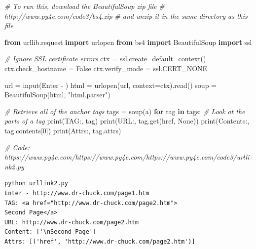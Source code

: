 \documentclass[10pt,]{book}
\newenvironment{Shaded}{}{}
\newcommand{\BuiltInTok}[1]{\textcolor[rgb]{0.00,0.50,0.00}{#1}}
\newcommand{\CommentTok}[1]{\textcolor[rgb]{0.38,0.63,0.69}{\textit{#1}}}
\newcommand{\ControlFlowTok}[1]{\textcolor[rgb]{0.00,0.44,0.13}{\textbf{#1}}}
\newcommand{\DecValTok}[1]{\textcolor[rgb]{0.25,0.63,0.44}{#1}}
\newcommand{\ImportTok}[1]{\textcolor[rgb]{0.00,0.50,0.00}{\textbf{#1}}}
\newcommand{\KeywordTok}[1]{\textcolor[rgb]{0.00,0.44,0.13}{\textbf{#1}}}
\newcommand{\NormalTok}[1]{#1}
\newcommand{\OperatorTok}[1]{\textcolor[rgb]{0.40,0.40,0.40}{#1}}
\newcommand{\StringTok}[1]{\textcolor[rgb]{0.25,0.44,0.63}{#1}}
\newcommand{\VariableTok}[1]{\textcolor[rgb]{0.10,0.09,0.49}{#1}}
\begin{document}
\begin{Shaded}
\begin{Highlighting}[]
\CommentTok{\# To run this, download the BeautifulSoup zip file}
\CommentTok{\# http://www.py4e.com/code3/bs4.zip}
\CommentTok{\# and unzip it in the same directory as this file}

\ImportTok{from}\NormalTok{ urllib.request }\ImportTok{import}\NormalTok{ urlopen}
\ImportTok{from}\NormalTok{ bs4 }\ImportTok{import}\NormalTok{ BeautifulSoup}
\ImportTok{import}\NormalTok{ ssl}

\CommentTok{\# Ignore SSL certificate errors}
\NormalTok{ctx }\OperatorTok{=}\NormalTok{ ssl.create\_default\_context()}
\NormalTok{ctx.check\_hostname }\OperatorTok{=} \VariableTok{False}
\NormalTok{ctx.verify\_mode }\OperatorTok{=}\NormalTok{ ssl.CERT\_NONE}

\NormalTok{url }\OperatorTok{=} \BuiltInTok{input}\NormalTok{(}\StringTok{\textquotesingle{}Enter {-} \textquotesingle{}}\NormalTok{)}
\NormalTok{html }\OperatorTok{=}\NormalTok{ urlopen(url, context}\OperatorTok{=}\NormalTok{ctx).read()}
\NormalTok{soup }\OperatorTok{=}\NormalTok{ BeautifulSoup(html, }\StringTok{"html.parser"}\NormalTok{)}

\CommentTok{\# Retrieve all of the anchor tags}
\NormalTok{tags }\OperatorTok{=}\NormalTok{ soup(}\StringTok{\textquotesingle{}a\textquotesingle{}}\NormalTok{)}
\ControlFlowTok{for}\NormalTok{ tag }\KeywordTok{in}\NormalTok{ tags:}
    \CommentTok{\# Look at the parts of a tag}
    \BuiltInTok{print}\NormalTok{(}\StringTok{\textquotesingle{}TAG:\textquotesingle{}}\NormalTok{, tag)}
    \BuiltInTok{print}\NormalTok{(}\StringTok{\textquotesingle{}URL:\textquotesingle{}}\NormalTok{, tag.get(}\StringTok{\textquotesingle{}href\textquotesingle{}}\NormalTok{, }\VariableTok{None}\NormalTok{))}
    \BuiltInTok{print}\NormalTok{(}\StringTok{\textquotesingle{}Contents:\textquotesingle{}}\NormalTok{, tag.contents[}\DecValTok{0}\NormalTok{])}
    \BuiltInTok{print}\NormalTok{(}\StringTok{\textquotesingle{}Attrs:\textquotesingle{}}\NormalTok{, tag.attrs)}

\CommentTok{\# Code: https://www.py4e.com/https://www.py4e.com/https://www.py4e.com/code3/urllink2.py}
\end{Highlighting}
\end{Shaded}

{\small
\begin{verbatim}
python urllink2.py
Enter - http://www.dr-chuck.com/page1.htm
TAG: <a href="http://www.dr-chuck.com/page2.htm">
Second Page</a>
URL: http://www.dr-chuck.com/page2.htm
Content: ['\nSecond Page']
Attrs: [('href', 'http://www.dr-chuck.com/page2.htm')]
\end{verbatim}
}
\end{document}

